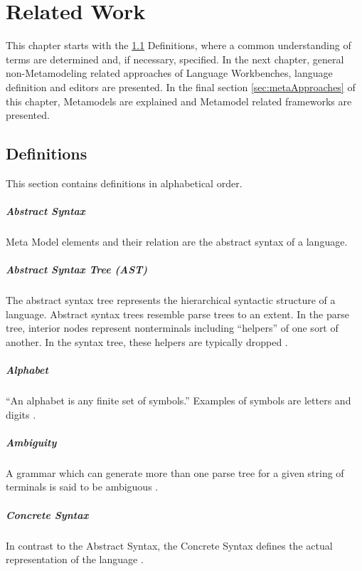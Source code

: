 \chapter{Related Work}
This chapter starts with the \ref{sec:def} Definitions, where a common understanding of terms are determined and, if necessary, specified. In the next chapter, general non-Metamodeling related approaches of Language Workbenches, language definition and editors are presented. In the final section \ref{sec:metaApproaches} of this chapter, Metamodels are explained and Metamodel related frameworks are presented.

\section{Definitions} \label{sec:def}
This section contains definitions in alphabetical order. 
\paragraph{Abstract Syntax} Meta Model elements and their relation are the abstract syntax of a language. \cite{MDSD}

\paragraph{Abstract Syntax Tree (AST)}  
The abstract syntax tree represents the hierarchical syntactic structure of a language.  Abstract syntax trees resemble parse trees to an extent. In the parse tree, interior nodes represent nonterminals including ``helpers'' of one sort of another. In the syntax tree, these helpers are typically dropped \cite{DragonBook}.

\paragraph{Alphabet}
``An alphabet is any finite set of symbols.'' Examples of symbols are letters and digits \cite{DragonBook}.


\paragraph{Ambiguity} 
A grammar which can generate more than one parse tree for a given string of terminals is said to be ambiguous \cite{DragonBook}.

 
\paragraph{Concrete Syntax} In contrast to the Abstract Syntax, the Concrete Syntax defines the actual representation of the language \cite{MDSD}.

